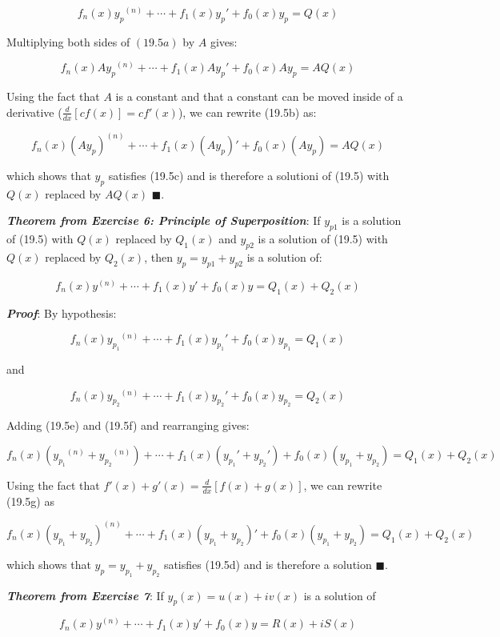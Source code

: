 \documentclass{article}
\begin{document}
\[ \tag{19.5a} f_n(x){y_p}^{(n)} + \cdots + f_1(x){y_p}' + f_0(x){y_p} = Q(x) \]

Multiplying both sides of $(19.5a)$ by $A$ gives:

\[ \tag{19.5b} f_n(x)A{y_p}^{(n)} + \cdots + f_1(x)A{y_p}' + f_0(x)A{y_p} = AQ(x) \]

Using the fact that $A$ is a constant and that a constant can be moved inside of a derivative ($\frac{d}{dx}[cf(x)] = cf'(x)$), we can rewrite (19.5b) as:

\[ \tag{19.5c} f_n(x){(Ay_p)}^{(n)} + \cdots + f_1(x){(Ay_p)}' + f_0(x){(Ay_p)} = AQ(x) \]

which shows that $y_p$ satisfies (19.5c) and is therefore a solutioni of (19.5) with $Q(x)$ replaced by $AQ(x)$ $\blacksquare$.

\emph{\textbf{Theorem from Exercise 6: Principle of Superposition}}: If $y_{p1}$ is a solution of (19.5) with $Q(x)$ replaced by $Q_1(x)$ and $y_{p2}$ is a solution of (19.5) with $Q(x)$ replaced by $Q_2(x)$, then $y_p = y_{p1} + y_{p2}$ is a solution of:

\[ \tag{19.5d} f_n(x)y^{(n)} + \cdots + f_1(x)y' + f_0(x)y = Q_1(x) + Q_2(x) \]

\emph{\textbf{Proof}}: By hypothesis:

\[ \tag{19.5e} f_n(x){y_{p_1}}^{(n)} + \cdots + f_1(x){y_{p_1}}' + f_0(x)y_{p_1} = Q_1(x) \]

and

\[ \tag{19.5f} f_n(x){y_{p_2}}^{(n)} + \cdots + f_1(x){y_{p_2}}' + f_0(x)y_{p_2} = Q_2(x) \]

Adding (19.5e) and (19.5f) and rearranging gives:

\[ \tag{19.5g} f_n(x)({y_{p_1}}^{(n)} + {y_{p_2}}^{(n)}) + \cdots + f_1(x)({y_{p_1}}' + {y_{p_2}}') + f_0(x)({y_{p_1}} + {y_{p_2}})  = Q_1(x) + Q_2(x) \]

Using the fact that $f'(x) + g'(x) = \frac{d}{dx}[f(x) + g(x)]$, we can rewrite (19.5g) as

\[ \tag{19.5h} f_n(x)(y_{p_1} + y_{p_2})^{(n)} + \cdots + f_1(x)(y_{p_1} + y_{p_2})' + f_0(x)(y_{p_1} + y_{p_2}) = Q_1(x) + Q_2(x) \]

which shows that $y_p = y_{p_1} + y_{p_2}$ satisfies (19.5d) and is therefore a solution $\blacksquare$.

\emph{\textbf{Theorem from Exercise 7}}: If $y_p(x) = u(x) + iv(x)$ is a solution of 

\[ \tag{19.5i} f_n(x)y^{(n)} + \cdots + f_1(x)y' + f_0(x)y = R(x) + iS(x) \]
\end{document}
